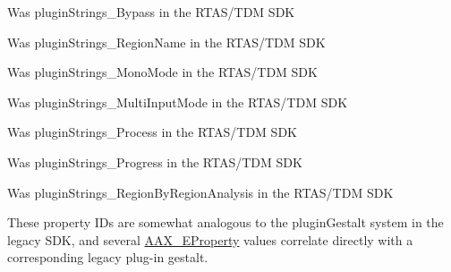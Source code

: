 \begin{DoxyRefList}
%
 Was plugin\+Strings\+\_\+\+Bypass in the RTAS/\+TDM SDK  
\item[Member \mbox{\hyperlink{a00503_a86f7310877399d9d4d2ea4863d472476ab33b745bc2c47f9c95bad0125ff6c816}{AAX\+\_\+e\+Plug\+In\+Strings\+\_\+\+Clip\+Name}} ]\label{a00802__porting_notes000017}%
%
 Was plugin\+Strings\+\_\+\+Region\+Name in the RTAS/\+TDM SDK  
\item[Member \mbox{\hyperlink{a00503_a86f7310877399d9d4d2ea4863d472476ace28c7a0863e1adef165d0f3b52a9660}{AAX\+\_\+e\+Plug\+In\+Strings\+\_\+\+Mono\+Mode}} ]\label{a00802__porting_notes000013}%
%
 Was plugin\+Strings\+\_\+\+Mono\+Mode in the RTAS/\+TDM SDK  
\item[Member \mbox{\hyperlink{a00503_a86f7310877399d9d4d2ea4863d472476a4e05ed47ae75ef3c99ed7b5599da6e53}{AAX\+\_\+e\+Plug\+In\+Strings\+\_\+\+Multi\+Input\+Mode}} ]\label{a00802__porting_notes000014}%
%
 Was plugin\+Strings\+\_\+\+Multi\+Input\+Mode in the RTAS/\+TDM SDK  
\item[Member \mbox{\hyperlink{a00503_a86f7310877399d9d4d2ea4863d472476a28ef93b11664703ce99624d99b2d163c}{AAX\+\_\+e\+Plug\+In\+Strings\+\_\+\+Process}} ]\label{a00802__porting_notes000019}%
%
 Was plugin\+Strings\+\_\+\+Process in the RTAS/\+TDM SDK  
\item[Member \mbox{\hyperlink{a00503_a86f7310877399d9d4d2ea4863d472476a2524774deef9e82058134126dc729a5a}{AAX\+\_\+e\+Plug\+In\+Strings\+\_\+\+Progress}} ]\label{a00802__porting_notes000018}%
%
 Was plugin\+Strings\+\_\+\+Progress in the RTAS/\+TDM SDK  
\item[Member \mbox{\hyperlink{a00503_a86f7310877399d9d4d2ea4863d472476ae3a832bfc597a707358610647b3f51c3}{AAX\+\_\+e\+Plug\+In\+Strings\+\_\+\+Region\+By\+Region\+Analysis}} ]\label{a00802__porting_notes000015}%
%
 Was plugin\+Strings\+\_\+\+Region\+By\+Region\+Analysis in the RTAS/\+TDM SDK  
\item[Member \mbox{\hyperlink{a00674_a13e384f22825afd3db6d68395b79ce0d}{AAX\+\_\+\+EProperty}} ]\label{a00802__porting_notes000039}%
%
 These property IDs are somewhat analogous to the plugin\+Gestalt system in the legacy SDK, and several \mbox{\hyperlink{a00674_a13e384f22825afd3db6d68395b79ce0d}{AAX\+\_\+\+EProperty}} values correlate directly with a corresponding legacy plug-\/in gestalt.


\end{DoxyRefList}
